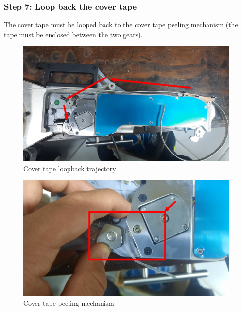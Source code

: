\documentclass[a4paper,10pt]{report}
\begin{document}
\subsubsection{Step 7: Loop back the cover tape}
The cover tape must be looped back to the cover tape peeling mechanism (the tape must be enclosed between the two gears).
\begin{figure}[!htb]
 \centering
 \includegraphics[width=1\textwidth]{step7.png}
 \caption{Cover tape loopback trajectory}
\end{figure}
\begin{figure}[!htb]
 \centering
 \includegraphics[width=1\textwidth]{peeler.png}
 \caption{Cover tape peeling mechanism}
\end{figure}
\newpage
\end{document}
